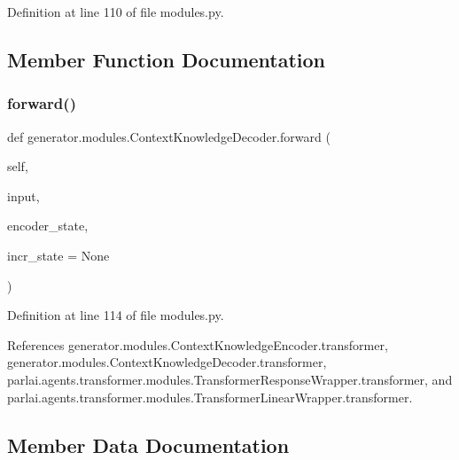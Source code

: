 Definition at line 110 of file modules.\+py.



\subsection{Member Function Documentation}
\mbox{\label{classgenerator_1_1modules_1_1ContextKnowledgeDecoder_a714ee85450e8d0c03fb12ed7b086ac38}} 
\subsubsection{\texorpdfstring{forward()}{forward()}}
{\footnotesize\ttfamily def generator.\+modules.\+Context\+Knowledge\+Decoder.\+forward (\begin{DoxyParamCaption}\item[{}]{self,  }\item[{}]{input,  }\item[{}]{encoder\+\_\+state,  }\item[{}]{incr\+\_\+state = {\ttfamily None} }\end{DoxyParamCaption})}



Definition at line 114 of file modules.\+py.



References generator.\+modules.\+Context\+Knowledge\+Encoder.\+transformer, generator.\+modules.\+Context\+Knowledge\+Decoder.\+transformer, parlai.\+agents.\+transformer.\+modules.\+Transformer\+Response\+Wrapper.\+transformer, and parlai.\+agents.\+transformer.\+modules.\+Transformer\+Linear\+Wrapper.\+transformer.



\subsection{Member Data Documentation}
\mbox{\label{classgenerator_1_1modules_1_1ContextKnowledgeDecoder_a0e32b662447578af9e827b9a310047be}} 
